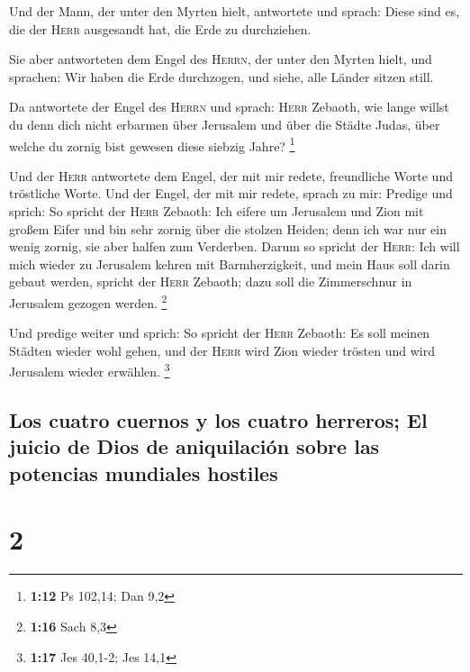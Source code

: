  Und der Mann, der unter den Myrten hielt, antwortete und
sprach: Diese sind es, die der \textsc{Herr} ausgesandt hat, die Erde zu
durchziehen.

 Sie aber antworteten dem Engel des \textsc{Herrn}, der
unter den Myrten hielt, und sprachen: Wir haben die Erde durchzogen, und
siehe, alle Länder sitzen still.

 Da antwortete der Engel des \textsc{Herrn} und sprach:
\textsc{Herr} Zebaoth, wie lange willst du denn dich nicht erbarmen über
Jerusalem und über die Städte Judas, über welche du zornig bist gewesen
diese siebzig Jahre? \footnote{\textbf{1:12} Ps 102,14; Dan 9,2}

 Und der \textsc{Herr} antwortete dem Engel, der mit mir
redete, freundliche Worte und tröstliche Worte.  Und der
Engel, der mit mir redete, sprach zu mir: Predige und sprich: So spricht
der \textsc{Herr} Zebaoth: Ich eifere um Jerusalem und Zion mit großem
Eifer  und bin sehr zornig über die stolzen Heiden; denn
ich war nur ein wenig zornig, sie aber halfen zum Verderben.
 Darum so spricht der \textsc{Herr}: Ich will mich wieder
zu Jerusalem kehren mit Barmherzigkeit, und mein Haus soll darin gebaut
werden, spricht der \textsc{Herr} Zebaoth; dazu soll die Zimmerschnur in
Jerusalem gezogen werden. \footnote{\textbf{1:16} Sach 8,3}

 Und predige weiter und sprich: So spricht der
\textsc{Herr} Zebaoth: Es soll meinen Städten wieder wohl gehen, und der
\textsc{Herr} wird Zion wieder trösten und wird Jerusalem wieder
erwählen. \footnote{\textbf{1:17} Jes 40,1-2; Jes 14,1}

\hypertarget{los-cuatro-cuernos-y-los-cuatro-herreros-el-juicio-de-dios-de-aniquilaciuxf3n-sobre-las-potencias-mundiales-hostiles}{%
\subsection{Los cuatro cuernos y los cuatro herreros; El juicio de Dios
de aniquilación sobre las potencias mundiales
hostiles}\label{los-cuatro-cuernos-y-los-cuatro-herreros-el-juicio-de-dios-de-aniquilaciuxf3n-sobre-las-potencias-mundiales-hostiles}}

\hypertarget{section-1}{%
\section{2}\label{section-1}}

